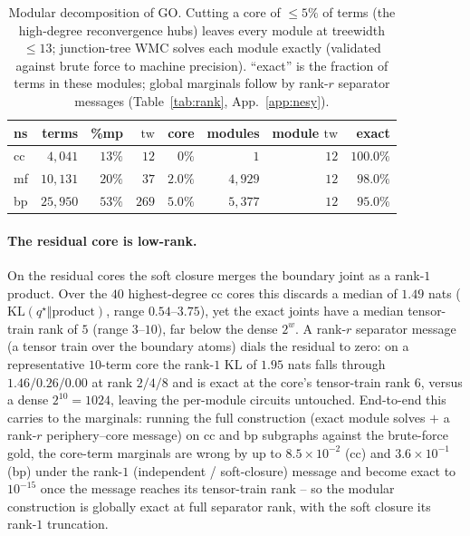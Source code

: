 \documentclass[anon]{nesy2026}
\newcommand{\tw}{\ensuremath{\mathrm{tw}}}
\begin{document}
\begin{table}[t]\centering
\caption{Modular decomposition of GO. Cutting a core of ${\le}5\%$ of terms (the high-degree
reconvergence hubs) leaves every module at treewidth ${\le}13$; junction-tree WMC solves each
module exactly (validated against brute force to machine precision). ``exact'' is the fraction
of terms in these modules; global marginals follow by rank-$r$ separator messages
(Table~\ref{tab:rank}, App.~\ref{app:nesy}).}\label{tab:modular}
\small
\begin{tabular}{lrrrrrrr}
\toprule
ns & terms & \%mp & \tw & core & modules & module \tw & exact \\
\midrule
cc & $4{,}041$  & $13\%$ & $12$  & $0\%$   & $1$      & $12$ & $100.0\%$ \\
mf & $10{,}131$ & $20\%$ & $37$  & $2.0\%$ & $4{,}929$ & $12$ & $98.0\%$ \\
bp & $25{,}950$ & $53\%$ & $269$ & $5.0\%$ & $5{,}377$ & $12$ & $95.0\%$ \\
\bottomrule
\end{tabular}
\end{table}

\paragraph{The residual core is low-rank.}
On the residual cores the soft closure merges the boundary joint as a rank-$1$ product. Over
the $40$ highest-degree cc cores this discards a median of $1.49$ nats
($\mathrm{KL}(q^\star\Vert\text{product})$, range $0.54$--$3.75$), yet the exact joints have a
median tensor-train rank of $5$ (range $3$--$10$), far below the dense $2^{w}$. A rank-$r$
separator message (a tensor train over the boundary atoms) dials the residual to zero: on a
representative $10$-term core the rank-$1$ $\mathrm{KL}$ of $1.95$ nats falls through
$1.46/0.26/0.00$ at rank $2/4/8$ and is exact at the core's tensor-train rank $6$, versus a
dense $2^{10}{=}1024$, leaving the per-module circuits untouched. End-to-end this carries to the
marginals: running the full construction (exact module solves $+$ a rank-$r$ periphery--core
message) on cc and bp subgraphs against the brute-force gold, the core-term marginals are wrong
by up to $8.5\times10^{-2}$ (cc) and $3.6\times10^{-1}$ (bp) under the rank-$1$ (independent /
soft-closure) message and become exact to $10^{-15}$ once the message reaches its tensor-train
rank -- so the modular construction is globally exact at full separator rank, with the soft
closure its rank-$1$ truncation.
\end{document}
